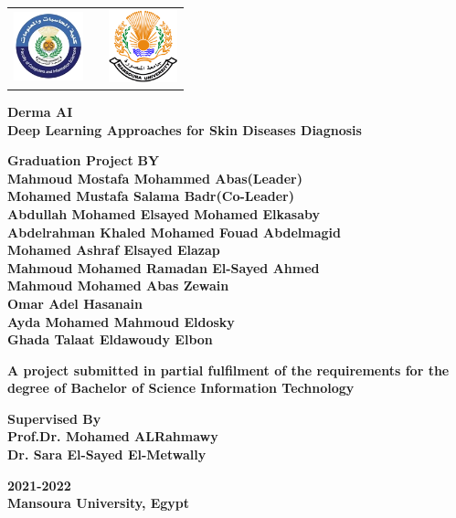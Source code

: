 \thispagestyle{empty}
\begin{center}

\begin{table}[h]
    \centering
    \begin{tabular}{c p{} c}
    \includegraphics[width=2cm]{frontmatter/figures/logo-faculty.png}
    &
    &
    \includegraphics[width=2cm]{frontmatter/figures/logo-university.png}
    \end{tabular}
\end{table}

\vfill
\begin{center}
    \large\textbf{Derma AI}\\
    \large\textbf{Deep Learning Approaches for Skin Diseases Diagnosis}\\
\end{center}
\vfill

\normalsize\textbf{Graduation Project}
\vfill
\normalsize\textbf{BY}
\\
\normalsize\textbf{Mahmoud Mostafa Mohammed Abas(Leader)}\\
\normalsize\textbf{Mohamed Mustafa Salama Badr(Co-Leader)}\\
\normalsize\textbf{Abdullah Mohamed Elsayed Mohamed  Elkasaby}\\
\normalsize\textbf{Abdelrahman Khaled Mohamed Fouad Abdelmagid}\\
\normalsize\textbf{Mohamed Ashraf Elsayed Elazap}\\
\normalsize\textbf {Mahmoud Mohamed Ramadan El-Sayed Ahmed}\\
\normalsize\textbf{Mahmoud Mohamed Abas Zewain}\\
\normalsize\textbf{Omar Adel Hasanain}\\
\normalsize\textbf{Ayda Mohamed Mahmoud Eldosky}\\
\normalsize\textbf{Ghada Talaat Eldawoudy Elbon}

\vfill

\normalsize\textbf{A project submitted in partial fulfilment of the requirements for the degree of Bachelor of Science Information Technology}
\\

\vfill

\small\textbf{Supervised By}
\\
\normalsize\large\textbf{Prof.Dr. Mohamed ALRahmawy}
\\
\normalsize\large\textbf{Dr. Sara El-Sayed El-Metwally}

\vfill

\small\textbf{2021-2022}
\\
\small\textbf{Mansoura University, Egypt}

\end{center}